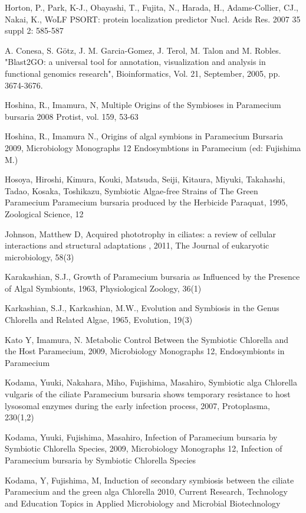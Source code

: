 \documentclass[a4paper,11pt]{article}
\begin{document}
 
\noindent Horton, P., Park, K-J., Obayashi, T., Fujita, N., Harada, H., Adams-Collier, CJ., Nakai, K., WoLF PSORT: protein localization predictor Nucl. Acids Res. 2007 35 suppl 2: 585-587

 
\noindent A. Conesa, S. Götz, J. M. Garcia-Gomez, J. Terol, M. Talon and M. Robles. "Blast2GO: a universal tool for annotation, visualization and analysis in functional genomics research", Bioinformatics, Vol. 21, September, 2005, pp. 3674-3676.

 
\noindent Hoshina, R., Imamura, N,  Multiple Origins of the Symbioses in Paramecium bursaria 2008 Protist, vol. 159, 53-63

 
\noindent Hoshina, R., Imamura N., Origins of algal symbions in Paramecium Bursaria 2009, Microbiology Monographs 12 Endosymbtions in Paramecium (ed: Fujishima M.)

 
\noindent Hosoya, Hiroshi,  Kimura, Kouki, Matsuda, Seiji, Kitaura, Miyuki,  Takahashi, Tadao, Kosaka, Toshikazu, Symbiotic Algae-free Strains of The Green Paramecium Paramecium bursaria produced by the Herbicide Paraquat, 1995, Zoological Science, 12

 
\noindent Johnson, Matthew D,  Acquired phototrophy in ciliates: a review of cellular interactions and structural adaptations , 2011, The Journal of eukaryotic microbiology, 58(3)

 
\noindent Karakashian, S.J., Growth of Paramecium bursaria as Influenced by the Presence of Algal Symbionts, 1963,  Physiological Zoology, 36(1)

 
\noindent Karkashian, S.J.,  Karkashian, M.W., Evolution and Symbiosis in the Genus Chlorella and Related Algae, 1965, Evolution,  19(3)

 
\noindent Kato Y, Imamura, N. Metabolic Control Between the Symbiotic Chlorella and the Host Paramecium, 2009,  Microbiology Monographs 12,  Endosymbionts in Paramecium

 
\noindent Kodama, Yuuki, Nakahara, Miho, Fujishima, Masahiro,  Symbiotic alga Chlorella vulgaris of the ciliate Paramecium bursaria shows temporary resistance to host lysosomal enzymes during the early infection process, 2007, Protoplasma, 230(1,2)

 
\noindent Kodama, Yuuki, Fujishima, Masahiro, Infection of Paramecium bursaria by Symbiotic Chlorella Species, 2009, Microbiology Monographs 12,  Infection of Paramecium bursaria by Symbiotic Chlorella Species

 
\noindent Kodama, Y, Fujishima, M,  Induction of secondary symbiosis between the ciliate Paramecium and the green alga Chlorella 2010,  Current Research, Technology and Education Topics in Applied Microbiology and Microbial Biotechnology
\end{document}
